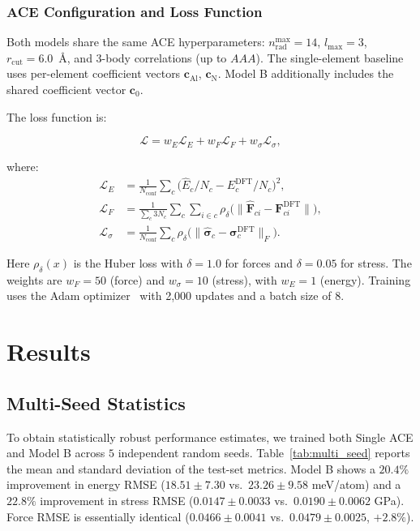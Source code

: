 \documentclass[twoside,prb,aps,floatfix,superscriptaddress,longbibliography]{revtex4-2}
\begin{document}
\subsubsection{ACE Configuration and Loss Function}

Both models share the same ACE hyperparameters: $n_{\mathrm{rad}}^{\mathrm{max}} = 14$, $l_{\mathrm{max}} = 3$, $r_{\mathrm{cut}} = 6.0$~\AA, and 3-body correlations (up to $AAA$). The single-element baseline uses per-element coefficient vectors $\mathbf{c}_{\mathrm{Al}}$, $\mathbf{c}_{\mathrm{N}}$. Model B additionally includes the shared coefficient vector $\mathbf{c}_0$.

The loss function is:

\begin{equation}
\mathcal{L} = w_E \mathcal{L}_E + w_F \mathcal{L}_F + w_\sigma \mathcal{L}_\sigma,
\label{eq:loss}
\end{equation}

where:
\begin{align}
\mathcal{L}_E &= \frac{1}{N_{\mathrm{conf}}} \sum_c \big( \hat{E}_c / N_c - E_c^{\mathrm{DFT}} / N_c \big)^2, \\
\mathcal{L}_F &= \frac{1}{\sum_c 3 N_c} \sum_c \sum_{i \in c} \rho_\delta \big( \| \hat{\mathbf{F}}_{ci} - \mathbf{F}_{ci}^{\mathrm{DFT}} \| \big), \\
\mathcal{L}_\sigma &= \frac{1}{N_{\mathrm{conf}}} \sum_c \rho_\delta\big( \| \hat{\boldsymbol{\sigma}}_c - \boldsymbol{\sigma}_c^{\mathrm{DFT}} \|_F \big).
\end{align}

Here $\rho_\delta(x)$ is the Huber loss with $\delta = 1.0$ for forces and $\delta = 0.05$ for stress. The weights are $w_F = 50$ (force) and $w_\sigma = 10$ (stress), with $w_E = 1$ (energy). Training uses the Adam optimizer~\cite{Kingma2015Adam} with 2,000 updates and a batch size of 8.

\section{Results}
\label{sec:results}

\subsection{Multi-Seed Statistics}
\label{sec:multi_seed}

To obtain statistically robust performance estimates, we trained both Single ACE and Model B across $5$ independent random seeds. Table~\ref{tab:multi_seed} reports the mean and standard deviation of the test-set metrics. Model B shows a $20.4\%$ improvement in energy RMSE ($18.51 \pm 7.30$ vs.\ $23.26 \pm 9.58$ meV/atom) and a $22.8\%$ improvement in stress RMSE ($0.0147 \pm 0.0033$ vs.\ $0.0190 \pm 0.0062$ GPa). Force RMSE is essentially identical ($0.0466 \pm 0.0041$ vs.\ $0.0479 \pm 0.0025$, $+2.8\%$).
\end{document}
